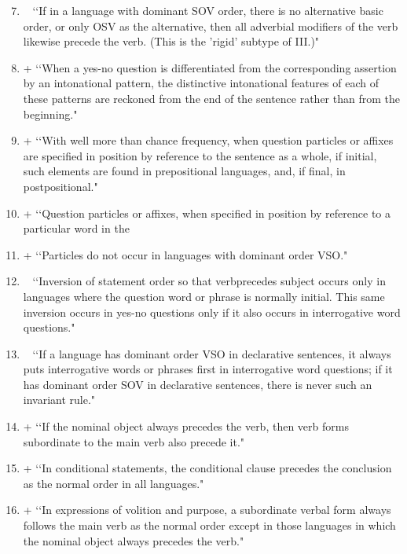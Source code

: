 \begin{enumerate}
\setcounter{enumi}{6}
\item ~  \lq\lq If in a language with dominant SOV order, there is no alternative basic order, or only OSV as the alternative, then all adverbial modifiers of the verb likewise precede the verb. (This is the 'rigid' subtype of III.)" 

\item +  \lq\lq When a yes-no question is differentiated from the corresponding assertion by an intonational pattern, the distinctive intonational features of each of these patterns are reckoned from the end of the sentence rather than from the beginning." 

\item +  \lq\lq With well more than chance frequency, when question particles or affixes are specified in position by reference to the sentence as a whole, if initial, such elements are found in prepositional languages, and, if final, in postpositional." 

\item +  \lq\lq Question particles or affixes, when specified in position by reference to a particular word in the  

\item +  \lq\lq Particles do not occur in languages with dominant order VSO." 

\item ~  \lq\lq Inversion of statement order so that verbprecedes subject occurs only in languages where the question word or phrase is normally initial. This same inversion occurs in yes-no questions only if it also occurs in interrogative word questions." 

\item ~  \lq\lq If a language has dominant order VSO in declarative sentences, it always puts interrogative words or phrases first in interrogative word questions; if it has dominant order SOV in declarative sentences, there is never such an invariant rule." 

\item +  \lq\lq If the nominal object always precedes the verb, then verb forms subordinate to the main verb also precede it." 

\item +  \lq\lq In conditional statements, the conditional clause precedes the conclusion as the normal order in all languages." 

\item +  \lq\lq In expressions of volition and purpose, a subordinate verbal form always follows the main verb as the normal order except in those languages in which the nominal object always precedes the verb." 


\end{enumerate}
